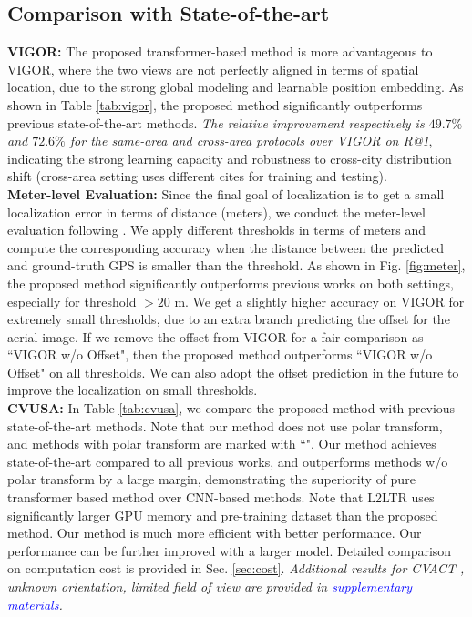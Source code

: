 \documentclass[10pt,twocolumn,letterpaper]{article}
\begin{document}
\subsection{Comparison with State-of-the-art}
\label{sec:compare}
\noindent\textbf{VIGOR:} The proposed transformer-based method is more advantageous to VIGOR, where the two views are not perfectly aligned in terms of spatial location, due to the strong global modeling and learnable position embedding. As shown in Table \ref{tab:vigor}, the proposed method significantly outperforms previous state-of-the-art methods. \emph{The relative improvement respectively is $49.7\%$ and $72.6\%$ for the same-area and cross-area protocols over VIGOR on R@1}, indicating the strong learning capacity and robustness to cross-city distribution shift (cross-area setting uses different cites for training and testing). \\
\textbf{Meter-level Evaluation:} Since the final goal of localization is to get a small localization error in terms of distance (meters), we conduct the meter-level evaluation following \cite{zhu2021vigor}. We apply different thresholds in terms of meters and compute the corresponding accuracy when the distance between the predicted and ground-truth GPS is smaller than the threshold. As shown in Fig. \ref{fig:meter}, the proposed method significantly outperforms previous works on both settings, especially for threshold $> 20$ m. We get  \cite{zhu2021vigor}  a slightly higher accuracy on VIGOR for extremely small thresholds, due to an extra branch predicting the offset for the aerial image. If we remove the offset  from VIGOR for a fair comparison as ``VIGOR w/o Offset", then the proposed method outperforms ``VIGOR w/o Offset" on all thresholds. We can also adopt the offset prediction in the future to improve the localization on small thresholds.\\
\noindent \textbf{CVUSA:} In Table \ref{tab:cvusa}, we compare the proposed method with previous state-of-the-art methods. Note that our method does not use polar transform, and methods with polar transform are marked with ``\dag". Our method achieves state-of-the-art  compared to all previous works, and outperforms methods w/o polar transform by a large margin, demonstrating the superiority of pure transformer based method over CNN-based methods. Note that L2LTR \cite{yang2021cross} uses significantly larger GPU memory and pre-training dataset than the proposed method. Our method is much more efficient with better performance. Our performance can be further improved with a larger model. Detailed comparison on computation cost is provided in Sec. \ref{sec:cost}. \emph{Additional results for CVACT \cite{liu2019lending}, unknown orientation, limited field of view are provided in \textcolor{blue}{supplementary materials}.}
\end{document}
